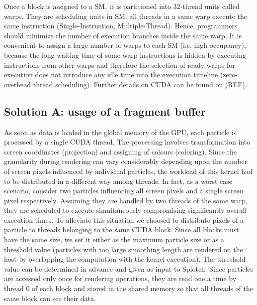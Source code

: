 \documentclass[11pt]{article}
\begin{document}
Once a block is assigned to a SM, it is partitioned into 32-thread units called warps. They are scheduling units in SM:
all threads in a same warp execute the same instruction (Single-Instruction, Multiple-Thread). Hence, programmers should minimize the number of execution branches inside the same warp. It is convenient to assign a large number of warps to each SM (i.e. high occupancy), because the long waiting time of some warp instructions is hidden by executing instructions from other warps  and therefore the selection of ready warps for execution does not introduce any idle time into the execution timeline (zero-overhead thread scheduling). Further details on CUDA can be found on (REF).


\subsection{Solution A: usage of a fragment buffer}

As soon as data is loaded in the global memory of the GPU, each particle is processed by a single CUDA thread. The processing involves transformation into screen coordinates (projection) and assigning of colours (coloring).  
Since the granularity during rendering can vary considerably depending upon the number of screen pixels influenced by individual particles, the workload of this kernel had to be distributed in a different way among threads.
In fact, as a worst case scenario, consider two particles influencing all screen pixels and a single screen pixel
respectively. Assuming they are handled by two threads of the same warp, they are scheduled to execute simultaneously compromising significantly overall execution times.
To alleviate this situation we choosed to distribute pixels of a particle to threads belonging to the same CUDA block. Since all blocks must have the same size, we set it either as the maximum particle size or as a threshold value (particles with too large smoothing length are rendered on the host by overlapping the computation with the kernel execution). The threshold value can be determined in advance and given as input to Splotch. Since particles are accessed only once for rendering operations, they are read one a time by thread 0 of each block and stored in the shared memory so that all threads of the same block can see their data. 
\end{document}
